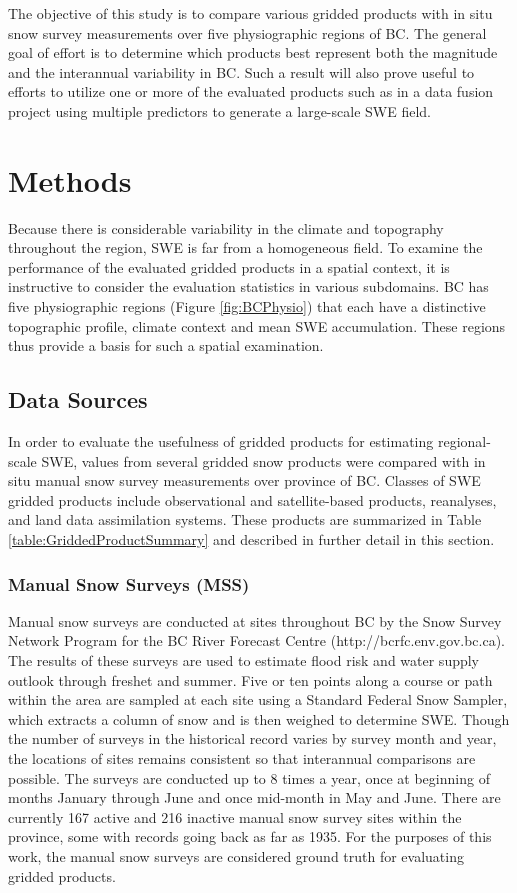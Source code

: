 \documentclass[12pt]{article}
\begin{document}
The objective of this study is to compare various gridded products with in situ snow survey measurements over five physiographic regions of BC.  The general goal of effort is to determine which products best represent both the magnitude and the interannual variability in BC.  Such a result will also prove useful to efforts to utilize one or more of the evaluated products such as in a data fusion project using multiple predictors to generate a large-scale SWE field.

\section{Methods}
Because there is considerable variability in the climate and topography throughout the region, SWE is far from a homogeneous field.  To examine the performance of the evaluated gridded products in a spatial context, it is instructive to consider the evaluation statistics in various subdomains.  BC has five physiographic regions (Figure \ref{fig:BCPhysio}) that each have a distinctive topographic profile, climate context and mean SWE accumulation.  These regions thus provide a basis for such a spatial examination.  

\subsection{Data Sources}
In order to evaluate the usefulness of gridded products for estimating regional-scale SWE, values from several gridded snow products were compared with in situ manual snow survey measurements over province of BC. Classes of SWE gridded products include observational and satellite-based products, reanalyses, and land data assimilation systems.  These products are summarized in Table \ref{table:GriddedProductSummary} and described in further detail in this section.

\subsubsection{Manual Snow Surveys (MSS)}
Manual snow surveys are conducted at sites throughout BC by the Snow Survey Network Program for the BC River Forecast Centre (http://bcrfc.env.gov.bc.ca). 
The results of these surveys are used to estimate flood risk and water supply outlook through freshet and summer.  Five or ten points along a course or path within the area are sampled at each site using a Standard Federal Snow Sampler, which extracts a column of snow and is then weighed to determine SWE.  Though the number of surveys in the historical record varies by survey month and year, the locations of sites remains consistent so that interannual comparisons are possible.  The surveys are conducted up to 8 times a year, once at beginning of months January through June and once mid-month in May and June.  There are currently 167 active and 216 inactive manual snow survey sites within the province, some with records going back as far as 1935.  For the purposes of this work, the manual snow surveys are considered ground truth for evaluating gridded products.
\end{document}
